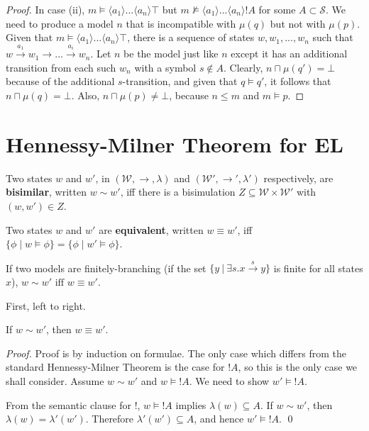\documentclass[smallextended]{svjour3}       %
\numberwithin{subcase}{mycase}
\def\fOr {\ | \ }
\begin{document}
\begin{proof}
In case (ii), $m \models \langle a_1 \rangle ... \langle a_n \rangle \top$ but $m \nvDash \langle a_1 \rangle ... \langle a_n \rangle !A$ for some $A \subset \mathcal{S}$. We need to produce a model $n$ that is incompatible with $\mu(q)$ but not with $\mu(p)$. Given that $m \models \langle a_1 \rangle ... \langle a_n \rangle \top$, there is a sequence of states $w, w_1, ..., w_n$ such that $w \xrightarrow{a_1} w_1 \rightarrow ... \xrightarrow{a_i} w_n$. Let $n$ be the model just like $n$ except it has an additional transition from each such $w_n$ with a symbol $s \notin A$. Clearly, $n \sqcap \mu(q') = \bot$ because of the additional $s$-transition, and given that $q \models q'$, it follows that $n \sqcap \mu(q) = \bot$. Also, $n \sqcap \mu(p) \neq \bot$, because $n \leq m$ and $m \models p$.


\end{proof}

\section{Hennessy-Milner Theorem for EL}

\begin{definition}
Two states $w$ and $w'$, in $(\mathcal{W}, \rightarrow, \lambda)$ and $(\mathcal{W}', \rightarrow', \lambda')$ respectively, are {\bf bisimilar}, written $w \sim w'$, iff there is a bisimulation $Z \subseteq  \mathcal{W} \times \mathcal{W}'$ with $(w,w') \in Z$.
\end{definition}

\begin{definition}
Two states $w$ and $w'$ are {\bf equivalent}, written $w \equiv w'$, iff $\{\phi \; | \; w \models \phi\} = \{\phi \; | \; w' \models \phi\}$.
\end{definition}
\begin{theorem}
If two models are finitely-branching (if the set $\{y \fOr \exists s . x \xrightarrow{s} y\}$ is finite for all states $x$), $w \sim w' \mbox{ iff } w \equiv w' $.
\end{theorem}
First, left to right.
\begin{case}
If $w \sim w'$, then $w \equiv w'$.
\end{case}
\begin{proof}
Proof is by induction on formulae.
The only case which differs from the standard Hennessy-Milner Theorem is the case for $!A$, so this is the only case we shall consider.
Assume $w \sim w'$ and $w \models !A$. We need to show $w' \models !A$.

From the semantic clause for $!$,  $w \models !A$ implies $\lambda(w) \subseteq A$.
If $w \sim w'$, then $\lambda(w) = \lambda'(w')$.
Therefore $\lambda'(w') \subseteq A$, and hence $w' \models !A$.
\qed
\end{proof}
\end{document}
